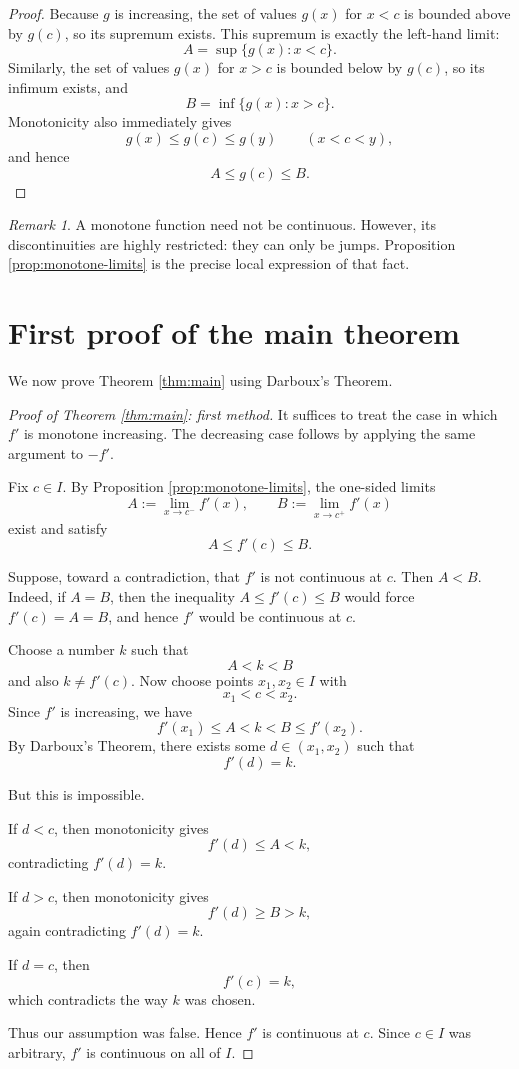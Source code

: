 \documentclass[11pt,a4paper]{amsart}
\theoremstyle{remark}
\newtheorem{remark}{Remark}
\begin{document}
\begin{proof}
Because $g$ is increasing, the set of values $g(x)$ for $x<c$ is bounded above by $g(c)$, so its supremum exists.
This supremum is exactly the left-hand limit:
\[
A=\sup\{g(x):x<c\}.
\]
Similarly, the set of values $g(x)$ for $x>c$ is bounded below by $g(c)$, so its infimum exists, and
\[
B=\inf\{g(x):x>c\}.
\]
Monotonicity also immediately gives
\[
g(x)\le g(c)\le g(y)
\qquad (x<c<y),
\]
and hence
\[
A\le g(c)\le B.
\]
\end{proof}

\begin{remark}
A monotone function need not be continuous.
However, its discontinuities are highly restricted: they can only be jumps.
Proposition \ref{prop:monotone-limits} is the precise local expression of that fact.
\end{remark}

\section{First proof of the main theorem}

We now prove Theorem \ref{thm:main} using Darboux's Theorem.

\begin{proof}[Proof of Theorem \ref{thm:main}: first method]
It suffices to treat the case in which $f'$ is monotone increasing.
The decreasing case follows by applying the same argument to $-f'$.

Fix $c\in I$.
By Proposition \ref{prop:monotone-limits}, the one-sided limits
\[
A:=\lim_{x\to c^-}f'(x),
\qquad
B:=\lim_{x\to c^+}f'(x)
\]
exist and satisfy
\[
A\le f'(c)\le B.
\]

Suppose, toward a contradiction, that $f'$ is not continuous at $c$.
Then $A<B$.
Indeed, if $A=B$, then the inequality $A\le f'(c)\le B$ would force
$f'(c)=A=B$, and hence $f'$ would be continuous at $c$.

Choose a number $k$ such that
\[
A<k<B
\]
and also $k\ne f'(c)$.
Now choose points $x_1,x_2\in I$ with
\[
x_1<c<x_2.
\]
Since $f'$ is increasing, we have
\[
f'(x_1)\le A<k<B\le f'(x_2).
\]
By Darboux's Theorem, there exists some $d\in(x_1,x_2)$ such that
\[
f'(d)=k.
\]

But this is impossible.

If $d<c$, then monotonicity gives
\[
f'(d)\le A<k,
\]
contradicting $f'(d)=k$.

If $d>c$, then monotonicity gives
\[
f'(d)\ge B>k,
\]
again contradicting $f'(d)=k$.

If $d=c$, then
\[
f'(c)=k,
\]
which contradicts the way $k$ was chosen.

Thus our assumption was false.
Hence $f'$ is continuous at $c$.
Since $c\in I$ was arbitrary, $f'$ is continuous on all of $I$.
\end{proof}
\end{document}
